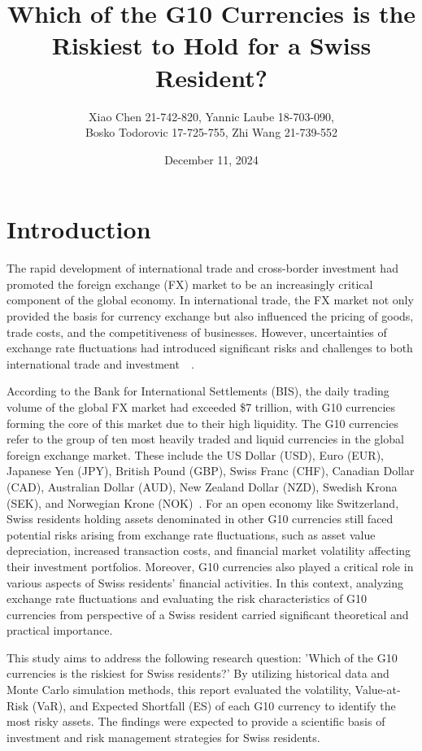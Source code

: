 \documentclass{article}
\title{\textbf{Which of the G10 Currencies is the Riskiest to Hold for a Swiss Resident?}}
\author{Xiao Chen 21-742-820, Yannic Laube 18-703-090, \\ Bosko Todorovic 17-725-755, Zhi Wang 21-739-552}
\date{December 11, 2024}
\begin{document}
\maketitle
\section{Introduction}
The rapid development of international trade and cross-border investment had promoted the foreign exchange (FX) market to be an increasingly critical component of the global economy. In international trade, the FX market not only provided the basis for currency exchange but also influenced the pricing of goods, trade costs, and the competitiveness of businesses. However, uncertainties of exchange rate fluctuations had introduced significant risks and challenges to both international trade and investment~\cite{AUBOIN_RUTA_2013}~\cite{riker2020review}.

According to the Bank for International Settlements (BIS), the daily trading volume of the global FX market had exceeded \$7 trillion, with G10 currencies forming the core of this market due to their high liquidity. The G10 currencies refer to the group of ten most heavily traded and liquid currencies in the global foreign exchange market. These include the US Dollar (USD), Euro (EUR), Japanese Yen (JPY), British Pound (GBP), Swiss Franc (CHF), Canadian Dollar (CAD), Australian Dollar (AUD), New Zealand Dollar (NZD), Swedish Krona (SEK), and Norwegian Krone (NOK)~\cite{bis2022report}. For an open economy like Switzerland, Swiss residents holding assets denominated in other G10 currencies still faced potential risks arising from exchange rate fluctuations, such as asset value depreciation, increased transaction costs, and financial market volatility affecting their investment portfolios. Moreover, G10 currencies also played a critical role in various aspects of Swiss residents' financial activities. In this context, analyzing exchange rate fluctuations and evaluating the risk characteristics of G10 currencies from perspective of a Swiss resident carried significant theoretical and practical importance.

This study aims to address the following research question: 'Which of the G10 currencies is the riskiest for Swiss residents?' By utilizing historical data and Monte Carlo simulation methods, this report evaluated the volatility, Value-at-Risk (VaR), and Expected Shortfall (ES) of each G10 currency to identify the most risky assets. The findings were expected to provide a scientific basis of investment and risk management strategies for Swiss residents.
\end{document}
